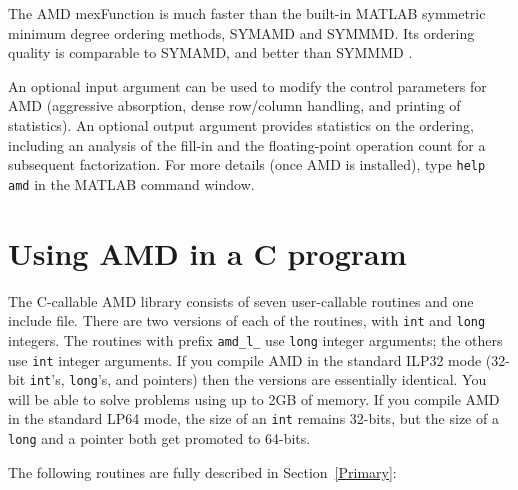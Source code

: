 \documentclass[11pt]{article}
\begin{document}
The AMD mexFunction is much faster than the built-in MATLAB symmetric minimum
degree ordering methods, SYMAMD and SYMMMD.  Its ordering quality is
comparable to SYMAMD, and better than SYMMMD
\cite{DavisGilbertLarimoreNg04}.

An optional input argument can be used to modify the control parameters for
AMD (aggressive absorption, dense row/column handling, and printing of
statistics).  An optional output
argument provides statistics on the ordering, including an analysis of the
fill-in and the floating-point operation count for a subsequent factorization.
For more details (once AMD is installed),
type {\tt help amd} in the MATLAB command window.

\section{Using AMD in a C program}
\label{Cversion}

The C-callable AMD library consists of seven user-callable routines and one
include file.  There are two versions of each of the routines, with
{\tt int} and {\tt long} integers.
The routines with prefix
{\tt amd\_l\_} use {\tt long} integer arguments; the others use
{\tt int} integer arguments.  If you compile AMD in the standard
ILP32 mode (32-bit {\tt int}'s, {\tt long}'s, and pointers) then the versions
are essentially identical.  You will be able to solve problems using up to 2GB
of memory.  If you compile AMD in the standard LP64 mode, the size of an
{\tt int} remains 32-bits, but the size of a {\tt long} and a pointer both get
promoted to 64-bits.

The following routines are fully described in Section~\ref{Primary}:
\end{document}

